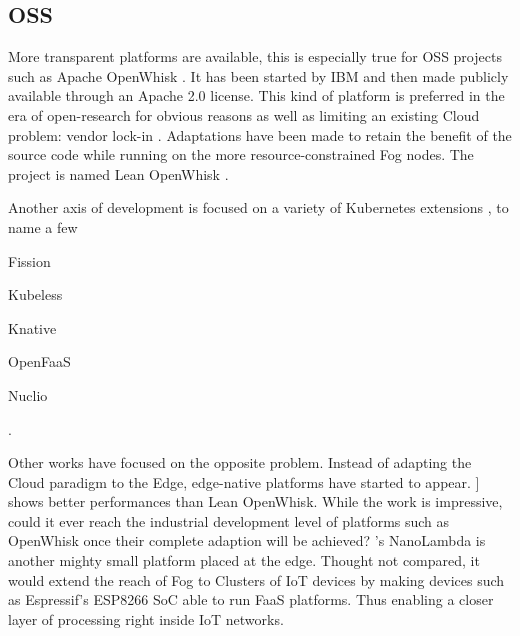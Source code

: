 \documentclass[11pt]{sdm}
\begin{document}
%    

\hypersetup{linkcolor=}
\subsection{\acrfull{OSS}}
More transparent platforms are available, this is especially true for \gls{OSS} projects such as Apache OpenWhisk \cite{noauthor_apache_nodate}. It has been started by IBM and then made publicly available through an Apache 2.0 license. This kind of platform is preferred in the era of open-research for obvious reasons as well as limiting an existing Cloud problem: vendor lock-in \cite{kjorveziroski_iot_2021}. Adaptations have been made to retain the benefit of the source code while running on the more resource-constrained Fog nodes. The project is named Lean OpenWhisk \cite{breitgand_lean_2018}.

Another axis of development is focused on a variety of Kubernetes extensions \cite{bocci_secure_2021}, to name a few
\begin{enumerate*}[(a)]
\item Fission
\item Kubeless
\item Knative
\item OpenFaaS
\item Nuclio
\end{enumerate*}.

Other works have focused on the opposite problem. Instead of adapting the Cloud paradigm to the Edge, edge-native platforms have started to appear. \citet{pfandzelter_tinyfaas_2020}] shows better performances than Lean OpenWhisk. While the work is impressive, could it ever reach the industrial development level of platforms such as OpenWhisk once their complete adaption will be achieved? 's NanoLambda is another mighty small platform placed at the edge. Thought not compared, it would extend the reach of Fog to Clusters of IoT devices by making devices such as Espressif's ESP8266 \gls{SoC} \cite{noauthor_esp8266_nodate} able to run \gls{FaaS} platforms. Thus enabling a closer layer of processing right inside IoT networks.
\end{document}
